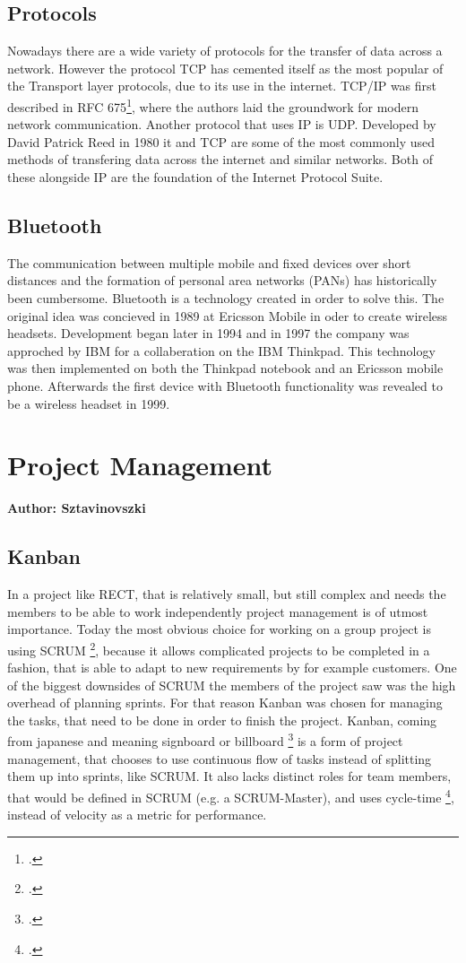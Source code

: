 \subsection{Protocols}
Nowadays there are a wide variety of protocols for the transfer of data across a network. However the protocol TCP has cemented 
itself as the most popular of the Transport layer protocols, due to its use in the internet. TCP/IP was first described in
RFC 675\footcite{rfc_675}, where the authors laid the groundwork for modern network communication. Another protocol that uses IP
is UDP. Developed by David Patrick Reed in 1980 it and TCP are some of the most commonly used methods of transfering data across
the internet and similar networks. Both of these alongside IP are the foundation of the Internet Protocol Suite.   

\subsection{Bluetooth}
The communication between multiple mobile and fixed devices over short distances and the formation of personal area networks (PANs)
has historically been cumbersome. Bluetooth is a technology created in order to solve this. The original idea was concieved in 1989
at Ericsson Mobile in oder to create wireless headsets. Development began later in 1994 and in 1997 the company was approched by IBM
for a collaberation on the IBM Thinkpad. This technology was then implemented on both the Thinkpad notebook and an Ericsson mobile phone.
Afterwards the first device with Bluetooth functionality was revealed to be a wireless headset in 1999.

\section{Project Management}
\textbf{Author: Sztavinovszki}

\subsection{Kanban}
In a project like RECT, that is relatively small, but still complex and needs the members to be able to work independently project management is of utmost importance. Today the most
obvious choice for working on a group project is using SCRUM \footcite{what-is-scrum}, because it allows complicated projects to be completed in a fashion, 
that is able to adapt to new requirements by for example customers. One of the biggest downsides of SCRUM the members of the project saw was the high overhead of planning sprints. 
For that reason Kanban was chosen for managing the tasks, that need to be done in order to finish the project. Kanban, coming from japanese and meaning signboard or billboard 
\footcite{what-is-kanban} is a form of project management, that chooses to use continuous flow of tasks instead of splitting them up into sprints, like SCRUM. 
It also lacks distinct roles for team members, that would be defined in SCRUM (e.g. a SCRUM-Master), and uses cycle-time \footcite{cycle-time-lead-time},
instead of velocity as a metric for performance. 

